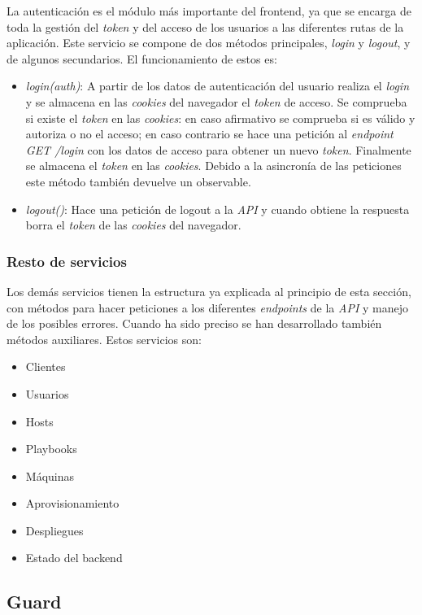 La autenticación es el módulo más importante del frontend, ya que se encarga de toda la gestión del \textit{token} y del acceso de los usuarios a las diferentes rutas de la aplicación. Este servicio se compone de dos métodos principales, \textit{login} y \textit{logout}, y de algunos secundarios. El funcionamiento de estos es:
\begin{itemize}
	\item \textit{login(auth)}: A partir de los datos de autenticación del usuario realiza el \textit{login} y se almacena en las \textit{cookies} del navegador el \textit{token} de acceso. Se comprueba si existe el \textit{token} en las \textit{cookies}: en caso afirmativo se comprueba si es válido y autoriza o no el acceso; en caso contrario se hace una petición al \textit{endpoint} \textit{GET /login} con los datos de acceso para obtener un nuevo \textit{token}. Finalmente se almacena el \textit{token} en las \textit{cookies}. Debido a la asincronía de las peticiones este método también devuelve un observable.
	\item \textit{logout()}: Hace una petición de logout a la \textit{API} y cuando obtiene la respuesta borra el \textit{token} de las \textit{cookies} del navegador.
\end{itemize}



\subsubsection{Resto de servicios}

Los demás servicios tienen la estructura ya explicada al principio de esta sección, con métodos para hacer peticiones a los diferentes \textit{endpoints} de la \textit{API} y manejo de los posibles errores. Cuando ha sido preciso se han desarrollado también métodos auxiliares. Estos servicios son:
\begin{itemize}
	\item Clientes
	\item Usuarios
	\item Hosts
	\item Playbooks
	\item Máquinas
	\item Aprovisionamiento
	\item Despliegues
	\item Estado del backend
\end{itemize}


\subsection{Guard}

